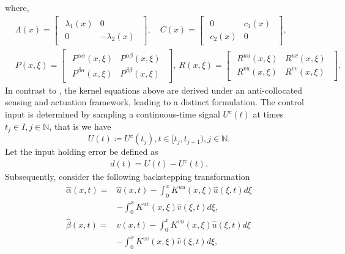\documentclass[letterpaper, 10 pt, conference]{ieeeconf}
\begin{document}
where,
{\footnotesize
\begin{align*}
    &\Lambda(x) = \begin{bmatrix}\begin{smallmatrix}\lambda_1(x)&0\\0&-\lambda_2(x)\end{smallmatrix}\end{bmatrix},\quad C(x) = \begin{bmatrix}\begin{smallmatrix}0&c_1(x)\\c_2(x)&0\end{smallmatrix}\end{bmatrix},\\
    &P(x,\xi) = \begin{bmatrix}\begin{smallmatrix}P^{\alpha\alpha}(x,\xi)&P^{\alpha\beta}(x,\xi)\\P^{\beta\alpha}(x,\xi)&P^{\beta\beta}(x,\xi)\end{smallmatrix}\end{bmatrix},~R(x,\xi) = \begin{bmatrix}\begin{smallmatrix}R^{uu}(x,\xi)&R^{uv}(x,\xi)\\R^{vu}(x,\xi)&R^{vv}(x,\xi)\end{smallmatrix}\end{bmatrix}.
\end{align*}}
In contrast to \cite{vazquez2011_2x2hyperbolic}, the kernel equations above are derived under an anti-collocated sensing and actuation framework, leading to a distinct formulation. The control input is determined by sampling a continuous-time signal $U^c(t)$ at times $t_j\in I, j\in\mathbb{N}$, that is we have
\begin{equation}
    U(t) \coloneqq U^c(t_j), t\in[t_j,t_{j+1}), j\in\mathbb{N}.\label{U}
\end{equation}
Let the input holding error be defined as
\begin{align}
d(t) = U(t) - U^c(t).\label{d}
\end{align}
Subsequently, consider the following backstepping transformation
\begin{align}
    \hat{\alpha}(x,t) =&\hat{u}(x,t)-\int_0^xK^{uu}(x,\xi)\hat{u}(\xi,t)d\xi \nonumber\\&-\int_0^xK^{uv}(x,\xi)\hat{v}(\xi,t)d\xi,\label{obs-backstepping1}\\
\hat{\beta}(x,t)  =&\hat{v}(x,t)-\int_0^x K^{vu}(x, \xi) \hat{u}(\xi,t) d\xi\nonumber\\&-\int_0^x K^{vv}(x, \xi) \hat{v}(\xi,t) d\xi,\label{obs-backstepping2} 
\end{align}
\end{document}
